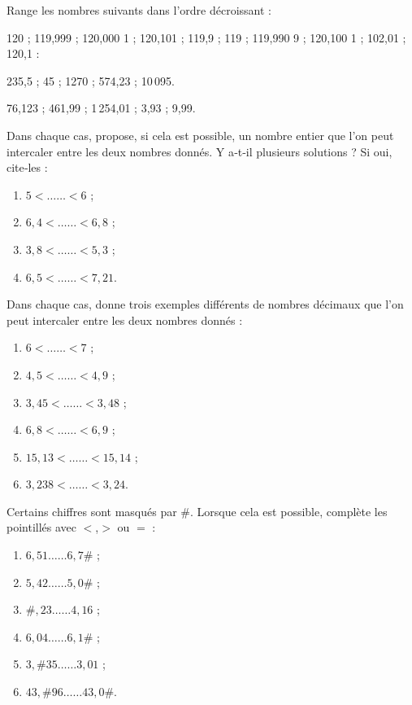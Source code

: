 \begin{exercice}
Range les nombres suivants dans l'ordre décroissant :

120 ; 119,999 ; 120,000 1 ; 120,101 ; 119,9 ; 119 ; 119,990 9 ; 120,100 1 ; 102,01 ; 120,1 :

\dotfill

\dotfill
\end{exercice}



\begin{exercice}
235,5 ; 45 ; 1270 ; 574,23 ; 10\,095.
\end{exercice}


\begin{exercice}
76,123 ; 461,99 ; 1\,254,01 ; 3,93 ; 9,99.
\end{exercice}



\begin{exercice}
Dans chaque cas, propose, si cela est possible, un nombre entier que l'on peut intercaler entre les deux nombres donnés. 
Y a‑t‑il plusieurs solutions ? Si oui, cite‑les :
\begin{enumerate}
 \item $5 < …… < 6$ ;
 \item $6,4 < …… < 6,8$ ;
 \item $3,8 < …… < 5,3$ ;
 \item $6,5 < …… < 7,21$.
 \end{enumerate}
\end{exercice}


\begin{exercice}
Dans chaque cas, donne trois exemples différents de nombres décimaux que l'on peut intercaler entre les deux nombres donnés :
\begin{enumerate}
 \item $6 < …… < 7$ ;
 \item $4,5 < …… < 4,9$ ;
 \item $3,45 < …… < 3,48$ ;
 \item $6,8 < …… < 6,9$ ;
 \item $15,13 < …… < 15,14$ ;
 \item $3,238 < …… < 3,24$.
 \end{enumerate}
\end{exercice}


\begin{exercice}
Certains chiffres sont masqués par \#. Lorsque cela est possible, complète les pointillés avec $<$,$>$ ou $=$ :
\begin{enumerate} 
 \item $6,51 …… 6,7\#$ ;
 \item $5,42 …… 5,0\#$ ;
 \item $\#,23 …… 4,16$ ;
 \item $6,04 …… 6,1\#$ ;
 \item $3,\#35 …… 3,01$ ;
 \item $43,\#96 …… 43,0\#$.
 \end{enumerate}
\end{exercice}


